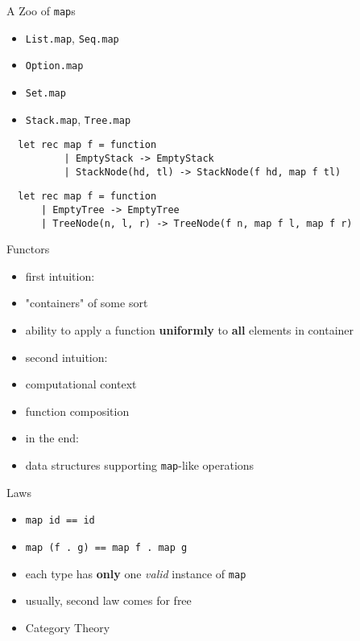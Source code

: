 \documentclass{beamer}
\begin{document}
\begin{frame}[fragile]{A Zoo of \texttt{map}s}
  \small
  \begin{itemize}[<+->]
    \item \texttt{List.map}, \texttt{Seq.map}
    \item \texttt{Option.map}
    \item \texttt{Set.map}
    \item \texttt{Stack.map}, \texttt{Tree.map}
  \end{itemize}
  \pause
  \begin{verbatim}
  let rec map f = function
          | EmptyStack -> EmptyStack
          | StackNode(hd, tl) -> StackNode(f hd, map f tl)
  \end{verbatim}
  \begin{verbatim}
  let rec map f = function
      | EmptyTree -> EmptyTree
      | TreeNode(n, l, r) -> TreeNode(f n, map f l, map f r)
  \end{verbatim}
\end{frame}

\begin{frame}{Functors}
  \begin{itemize}[<+->]
    \item first intuition:
    \item "containers" of some sort
    \item ability to apply a function \textbf{uniformly} to \textbf{all}
    elements in container
    \item second intuition:
    \item computational context
    \item function composition
    \item in the end:
    \item data structures supporting \texttt{map}-like operations
  \end{itemize}
\end{frame}

\begin{frame}{Laws}
  \begin{itemize}[<+->]
    \item \texttt{map id == \pause id}
    \pause
    \item \texttt{map (f . g) == \pause map f . \pause map g}
    \pause
    \item each type has \textbf{only} one \textit{valid} instance of \texttt{map}
    \item usually, second law comes for free
    \item Category Theory
  \end{itemize}
\end{frame}
\end{document}
